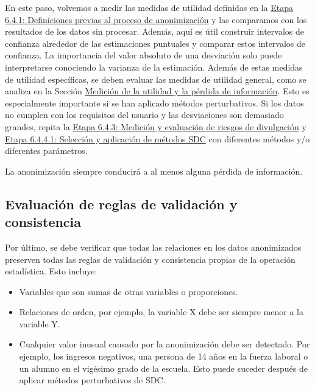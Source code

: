 \documentclass[
]{book}
\providecommand{\tightlist}{%
  \setlength{\itemsep}{0pt}\setlength{\parskip}{0pt}}
\theoremstyle{definition}
\theoremstyle{definition}
\theoremstyle{definition}
\theoremstyle{definition}
\theoremstyle{remark}
\begin{document}
En este paso, volvemos a medir las medidas de utilidad definidas en la \protect\hyperlink{etapa-6.4.1-definiciones-previas-al-proceso-de-anonimizaciuxf3n}{Etapa 6.4.1: Definiciones previas al proceso de anonimización} y las comparamos con los resultados de los datos sin procesar. Además, aquí es útil construir intervalos de confianza alrededor de las estimaciones puntuales y comparar estos intervalos de confianza. La importancia del valor absoluto de una desviación solo puede interpretarse conociendo la varianza de la estimación. Además de estas medidas de utilidad específicas, se deben evaluar las medidas de utilidad general, como se analiza en la Sección \protect\hyperlink{mediciuxf3n-de-la-utilidad-y-la-puxe9rdida-de-informaciuxf3n}{Medición de la utilidad y la pérdida de información}. Esto es especialmente importante si se han aplicado métodos perturbativos. Si los datos no cumplen con los requisitos del usuario y las desviaciones son demasiado grandes, repita la \protect\hyperlink{etapa-6.4.3-mediciuxf3n-y-evaluaciuxf3n-de-riesgos-de-divulgaciuxf3n}{Etapa 6.4.3: Medición y evaluación de riesgos de divulgación} y \protect\hyperlink{etapa-6.4.4.1-selecciuxf3n-y-aplicaciuxf3n-de-muxe9todos-sdc}{Etapa 6.4.4.1: Selección y aplicación de métodos SDC} con diferentes métodos y/o diferentes parámetros.

La anonimización siempre conducirá a al menos alguna pérdida de información.

\hypertarget{evaluaciuxf3n-de-reglas-de-validaciuxf3n-y-consistencia}{%
\subsection{Evaluación de reglas de validación y consistencia}\label{evaluaciuxf3n-de-reglas-de-validaciuxf3n-y-consistencia}}

Por último, se debe verificar que todas las relaciones en los datos anonimizados preserven todas las reglas de validación y consistencia propias de la operación estadística. Esto incluye:

\begin{itemize}
\tightlist
\item
  Variables que son sumas de otras variables o proporciones.
\item
  Relaciones de orden, por ejemplo, la variable X debe ser siempre menor a la variable Y.
\item
  Cualquier valor inusual causado por la anonimización debe ser detectado. Por ejemplo, los ingresos negativos, una persona de 14 años en la fuerza laboral o un alumno en el vigésimo grado de la escuela. Esto puede suceder después de aplicar métodos perturbativos de SDC.
\end{itemize}
\end{document}
